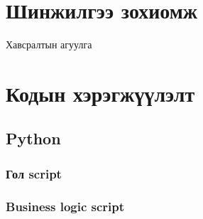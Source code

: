 \appendix
{}

\chapter{Шинжилгээ зохиомж}
Хавсралтын агуулга

\chapter{Кодын хэрэгжүүлэлт}
\section{Python}
\subsection{Гол script}

\subsection{Business logic script}

